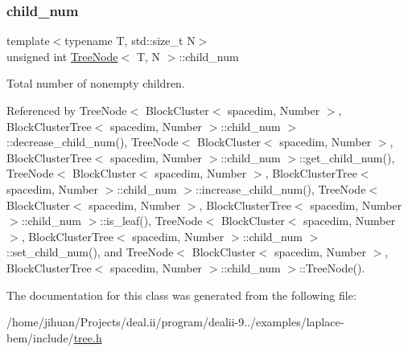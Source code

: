 \subsubsection{\texorpdfstring{child\+\_\+num}{child\_num}}
{\footnotesize\ttfamily template$<$typename T, std\+::size\+\_\+t N$>$ \\
unsigned int \hyperlink{classTreeNode}{Tree\+Node}$<$ T, N $>$\+::child\+\_\+num\hspace{0.3cm}{\ttfamily [private]}}

Total number of nonempty children. 

Referenced by Tree\+Node$<$ Block\+Cluster$<$ spacedim, Number $>$, Block\+Cluster\+Tree$<$ spacedim, Number $>$\+::child\+\_\+num $>$\+::decrease\+\_\+child\+\_\+num(), Tree\+Node$<$ Block\+Cluster$<$ spacedim, Number $>$, Block\+Cluster\+Tree$<$ spacedim, Number $>$\+::child\+\_\+num $>$\+::get\+\_\+child\+\_\+num(), Tree\+Node$<$ Block\+Cluster$<$ spacedim, Number $>$, Block\+Cluster\+Tree$<$ spacedim, Number $>$\+::child\+\_\+num $>$\+::increase\+\_\+child\+\_\+num(), Tree\+Node$<$ Block\+Cluster$<$ spacedim, Number $>$, Block\+Cluster\+Tree$<$ spacedim, Number $>$\+::child\+\_\+num $>$\+::is\+\_\+leaf(), Tree\+Node$<$ Block\+Cluster$<$ spacedim, Number $>$, Block\+Cluster\+Tree$<$ spacedim, Number $>$\+::child\+\_\+num $>$\+::set\+\_\+child\+\_\+num(), and Tree\+Node$<$ Block\+Cluster$<$ spacedim, Number $>$, Block\+Cluster\+Tree$<$ spacedim, Number $>$\+::child\+\_\+num $>$\+::\+Tree\+Node().



The documentation for this class was generated from the following file\+:\begin{DoxyCompactItemize}
\item 
/home/jihuan/\+Projects/deal.\+ii/program/dealii-\/9../examples/laplace-\/bem/include/\hyperlink{tree_8h}{tree.\+h}\end{DoxyCompactItemize}
